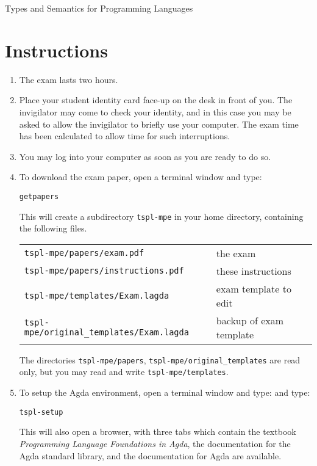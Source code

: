 \documentclass[12pt]{article}
\begin{document}
\pagestyle{empty}
\setcounter{page}{1}

\begin{center}
\large Types and Semantics for Programming Languages
\end{center}

\section*{Instructions}

\begin{enumerate}

\item
  The exam lasts two hours.

\item
  Place your student identity card face-up on the desk in front of you.  The
  invigilator may come to check your identity, and in this case you may be asked
  to allow the invigilator to briefly use your computer.  The exam time has been
  calculated to allow time for such interruptions.

\item
  You may log into your computer as soon as you are ready to do so.

\item
  To download the exam paper, open a terminal window and type:
  \begin{center}
    \texttt{getpapers}
  \end{center}
  This will create a subdirectory \texttt{tspl-mpe} in your home directory,
  containing the following files.
  \begin{center}
    \begin{tabular}{ll}
      \texttt{tspl-mpe/papers/exam.pdf}                & the exam \\
      \texttt{tspl-mpe/papers/instructions.pdf}        & these instructions \\
      \texttt{tspl-mpe/templates/Exam.lagda}           & exam template to edit \\
      \texttt{tspl-mpe/original\_templates/Exam.lagda} & backup of exam template
    \end{tabular}
  \end{center}
  The directories \texttt{tspl-mpe/papers}, \texttt{tspl-mpe/original\_templates}
  are read only, but you may read and write \texttt{tspl-mpe/templates}.

\item
  To setup the Agda environment, open a terminal window and type:
  and type:
  \begin{center}
    \texttt{tspl-setup}
  \end{center}
  This will also open a browser, with three tabs which contain the textbook
  \emph{Programming Language Foundations in Agda}, the documentation for the
  Agda standard library, and the documentation for Agda are available.


\end{enumerate}
\end{document}
